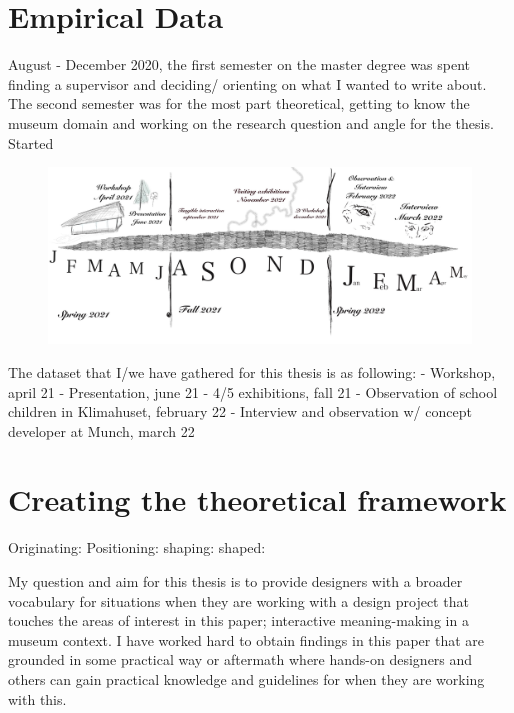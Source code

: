\section{Empirical Data}


August - December 2020, the first semester on the master degree was spent finding a supervisor and deciding/ orienting on what I wanted to write about. The second semester was for the most part theoretical, getting to know the museum domain and working on the research question and angle for the thesis. Started 

\begin{figure}[h]
\includegraphics[width=13cm]{pictures/timeline.jpg}
\centering 
\end{figure}

The dataset that I/we have gathered for this thesis is as following:
- Workshop, april 21
- Presentation, june 21
- 4/5 exhibitions, fall 21
- Observation of school children in Klimahuset, february 22
- Interview and observation w/ concept developer at Munch, march 22

\section{Creating the theoretical framework}

Originating:
Positioning:
shaping:
shaped:

My question and aim for this thesis is to provide designers with a broader vocabulary for situations when they are working with a design project that touches the areas of interest in this paper; interactive meaning-making in a museum context. I have worked hard to obtain findings in this paper that are grounded in some practical way or aftermath where hands-on designers and others can gain practical knowledge and guidelines for when they are working with this. 


